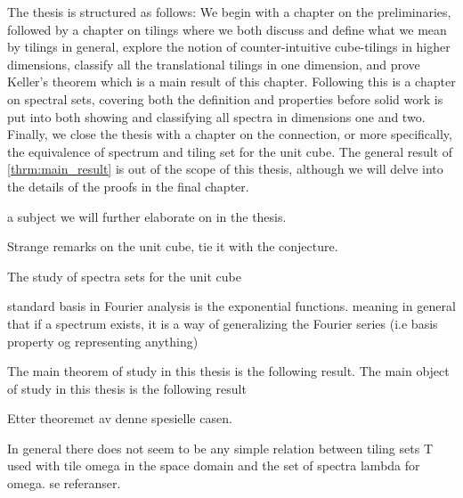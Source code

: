 \documentclass[../thesis.tex]{subfiles}
\begin{document}
The thesis is structured as follows: We begin with a chapter on the preliminaries, followed by a chapter on tilings where we both discuss and define what we mean by tilings in general, explore the notion of counter-intuitive cube-tilings in higher dimensions, classify all the translational tilings in one dimension, and prove Keller's theorem which is a main result of this chapter. Following this is a chapter on spectral sets, covering both the definition and properties before solid work is put into both showing and classifying all spectra in dimensions one and two. Finally, we close the thesis with a chapter on the connection, or more specifically, the equivalence of spectrum and tiling set for the unit cube. The general result of \cref{thrm:main_result} is out of the scope of this thesis, although we will delve into the details of the proofs in the final chapter.



a subject we will further elaborate on in the thesis. 


Strange remarks on the unit cube, tie it with the conjecture.

The study of spectra sets for the unit cube 



standard basis in Fourier analysis is the exponential functions. 
meaning in general that if a spectrum exists, it is a way of generalizing the Fourier series (i.e basis property og representing anything)



The main theorem of study in this thesis is the following result. 
The main object of study in this thesis is the following result 



Etter theoremet av denne spesielle casen. 

In general there does not seem to be any simple relation between tiling sets T used with tile omega in the space domain and the set of spectra lambda for omega. se referanser. 
\end{document}
